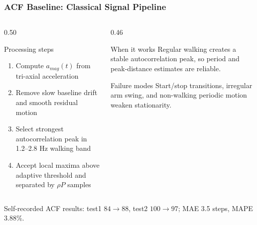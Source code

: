 \begin{frame}
	\frametitle{ACF Baseline: Classical Signal Pipeline}
	\footnotesize
	\begin{columns}[t]
		\begin{column}{0.50\textwidth}
			\begin{block}{Processing steps}
				\begin{enumerate}
					\item Compute $a_{mag}(t)$ from tri-axial acceleration
					\item Remove slow baseline drift and smooth residual motion
					\item Select strongest autocorrelation peak in 1.2--2.8 Hz walking band
					\item Accept local maxima above adaptive threshold and separated by $\rho P$ samples
				\end{enumerate}
			\end{block}
		\end{column}
		\begin{column}{0.46\textwidth}
			\begin{exampleblock}{When it works}
				Regular walking creates a stable autocorrelation peak, so period and peak-distance estimates are reliable.
			\end{exampleblock}
			\begin{alertblock}{Failure modes}
				Start/stop transitions, irregular arm swing, and non-walking periodic motion weaken stationarity.
			\end{alertblock}
		\end{column}
	\end{columns}

	\begin{center}
		\scriptsize Self-recorded ACF results: test1 $84\rightarrow88$, test2 $100\rightarrow97$; MAE 3.5 steps, MAPE 3.88\%.
	\end{center}
\end{frame}